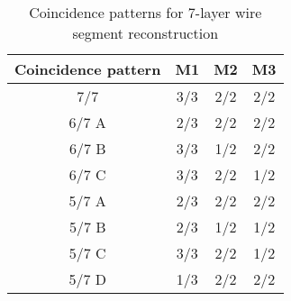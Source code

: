 \begin{table}[htbp]
\centering
\small
\caption{Coincidence patterns for 7-layer wire segment reconstruction}
\label{tab:wire_coin}
\begin{tabular}{c|ccc}
\hline
\textbf{Coincidence pattern} & \textbf{M1} & \textbf{M2} & \textbf{M3} \\
\hline
7/7       & 3/3 & 2/2 & 2/2 \\
6/7 A     & 2/3 & 2/2 & 2/2 \\
6/7 B     & 3/3 & 1/2 & 2/2 \\
6/7 C     & 3/3 & 2/2 & 1/2 \\
5/7 A     & 2/3 & 2/2 & 2/2 \\
5/7 B     & 2/3 & 1/2 & 1/2 \\
5/7 C     & 3/3 & 2/2 & 1/2 \\
5/7 D     & 1/3 & 2/2 & 2/2 \\
\hline
\end{tabular}
\end{table}